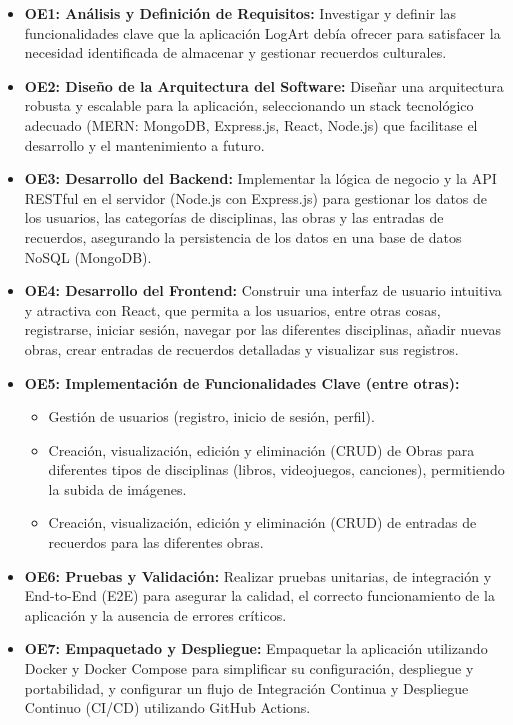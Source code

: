 \begin{itemize}
    \item \textbf{OE1: Análisis y Definición de Requisitos:}
    Investigar y definir las funcionalidades clave que la aplicación LogArt debía ofrecer para satisfacer la necesidad identificada de almacenar y gestionar recuerdos culturales.
    \item \textbf{OE2: Diseño de la Arquitectura del Software:}
    Diseñar una arquitectura robusta y escalable para la aplicación, seleccionando un stack tecnológico adecuado (MERN: MongoDB, Express.js, React, Node.js) que facilitase el desarrollo y el mantenimiento a futuro.
    \item \textbf{OE3: Desarrollo del Backend:}
    Implementar la lógica de negocio y la API RESTful en el servidor (Node.js con Express.js) para gestionar los datos de los usuarios, las categorías de disciplinas, las obras y las entradas de recuerdos, asegurando la persistencia de los datos en una base de datos NoSQL (MongoDB).
    \item \textbf{OE4: Desarrollo del Frontend:}
    Construir una interfaz de usuario intuitiva y atractiva con React, que permita a los usuarios, entre otras cosas, registrarse, iniciar sesión, navegar por las diferentes disciplinas, añadir nuevas obras, crear entradas de recuerdos detalladas y visualizar sus registros.
    \item \textbf{OE5: Implementación de Funcionalidades Clave (entre otras):}
        \begin{itemize}
            \item Gestión de usuarios (registro, inicio de sesión, perfil).
            \item Creación, visualización, edición y eliminación (CRUD) de Obras para diferentes tipos de disciplinas (libros, videojuegos, canciones), permitiendo la subida de imágenes.
            \item Creación, visualización, edición y eliminación (CRUD) de entradas de recuerdos para las diferentes obras.
        \end{itemize}
    \item \textbf{OE6: Pruebas y Validación:}
    Realizar pruebas unitarias, de integración y End-to-End (E2E) para asegurar la calidad, el correcto funcionamiento de la aplicación y la ausencia de errores críticos.
    \item \textbf{OE7: Empaquetado y Despliegue:}
    Empaquetar la aplicación utilizando Docker y Docker Compose para simplificar su configuración, despliegue y portabilidad, y configurar un flujo de Integración Continua y Despliegue Continuo (CI/CD) utilizando GitHub Actions.

\end{itemize}
